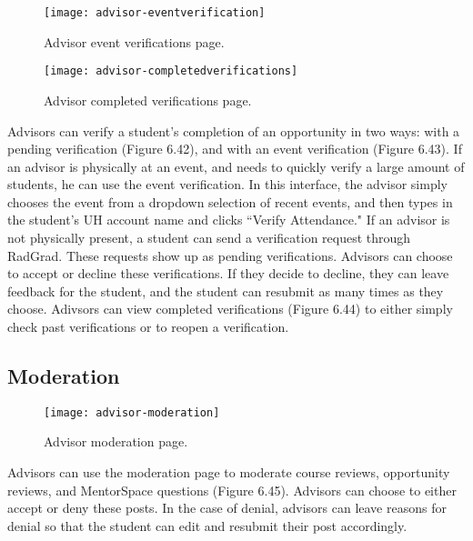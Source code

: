 \begin{figure}[htbp!]
\centering
\texttt{[image: advisor-eventverification]}
\caption{Advisor event verifications page.}
\end{figure}

\begin{figure}[htbp!]
\centering
\texttt{[image: advisor-completedverifications]}
\caption{Advisor completed verifications page.}
\end{figure}
Advisors can verify a student's completion of an opportunity in two ways: with a pending verification (Figure 6.42), and with an event verification (Figure 6.43). If an advisor is physically at an event, and needs to quickly verify a large amount of students, he can use the event verification. In this interface, the advisor simply chooses the event from a dropdown selection of recent events, and then types in the student's UH account name and clicks ``Verify Attendance." If an advisor is not physically present, a student can send a verification request through RadGrad. These requests show up as pending verifications. Advisors can choose to accept or decline these verifications. If they decide to decline, they can leave feedback for the student, and the student can resubmit as many times as they choose. Adivsors can view completed verifications (Figure 6.44) to either simply check past verifications or to reopen a verification.
\subsection{Moderation}
\begin{figure}[htbp!]
\centering
\texttt{[image: advisor-moderation]}
\caption{Advisor moderation page.}
\end{figure}
Advisors can use the moderation page to moderate course reviews, opportunity reviews, and MentorSpace questions (Figure 6.45). Advisors can choose to either accept or deny these posts. In the case of denial, advisors can leave reasons for denial so that the student can edit and resubmit their post accordingly. 
